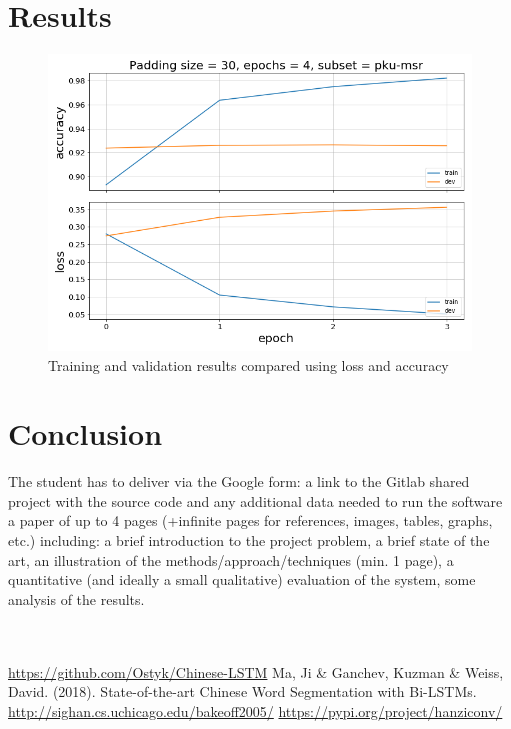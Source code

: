 \documentclass[12pt,a4paper]{article}
\begin{document}
\section{Results}

\begin{figure}[H]

\begin{center}
\includegraphics[width=0.7\columnwidth, angle = 0]{img/pku-msr.png}
\end{center}
\caption{Training and validation results compared using loss and accuracy}
\label{img:results}
\end{figure}
\section{Conclusion}


The student has to deliver via the Google form:
a link to the Gitlab shared project with the source code and any additional data needed to run the software
a paper of up to 4 pages (+infinite pages for references, images, tables, graphs, etc.) including: a brief introduction to the project problem, a brief state of the art, an illustration of the methods/approach/techniques (min. 1 page), a quantitative (and ideally a small qualitative) evaluation of the system, some analysis of the results.
\\\\\








\begin{thebibliography}{1}

 \url{https://github.com/Ostyk/Chinese-LSTM}
 Ma, Ji \& Ganchev, Kuzman \& Weiss, David. (2018). State-of-the-art Chinese Word Segmentation with Bi-LSTMs. 
 \url{http://sighan.cs.uchicago.edu/bakeoff2005/}
 \url{https://pypi.org/project/hanziconv/}

\end{thebibliography}
\end{document}
